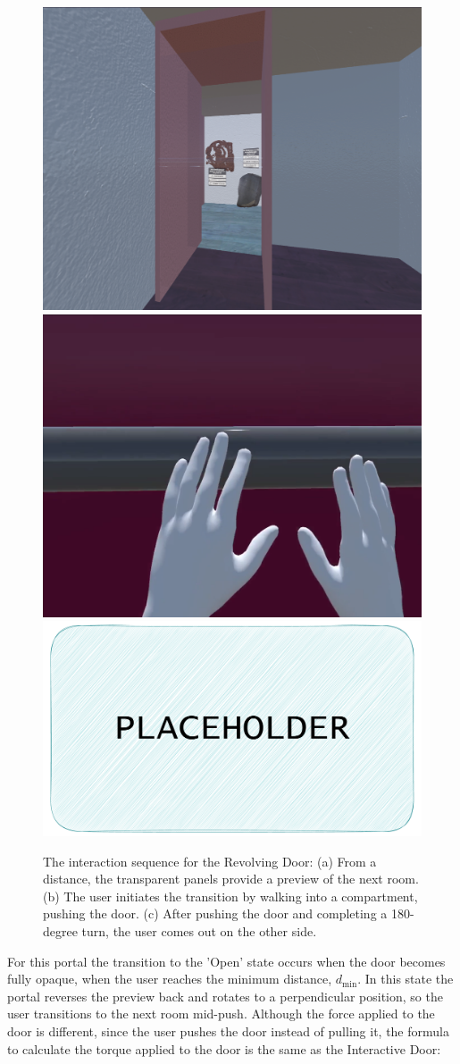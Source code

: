 \begin{figure}[t]
  \centering
  \includegraphics[width=.45\linewidth]{NOVAthesisFiles/Images/screenshots/Revolving Door Invisible.PNG}
  \hfill
  \includegraphics[width=.45\linewidth]{NOVAthesisFiles/Images/screenshots/Capture Revolving.PNG}
  \hfill
  \includegraphics[width=.45\linewidth]{NOVAthesisFiles/Images/placeholder.pdf}
  \caption{The interaction sequence for the Revolving Door: (a) From a distance, the transparent panels provide a preview of the next room. 
  (b) The user initiates the transition by walking into a compartment, pushing the door.
  (c) After pushing the door and completing a 180-degree turn, the user comes out on the other side. 
  }
  \label{fig:rv-door-sc}
\end{figure}

For this portal the transition to the 'Open' state occurs when the door becomes fully opaque, when the user reaches the minimum distance, $d_{\min}$.
In this state the portal reverses the preview back and rotates to a perpendicular position, so the user transitions to the next room mid-push.
Although the force applied to the door is different, since the user pushes the door instead of pulling it, the formula to calculate the 
torque applied to the door is the same as the Interactive Door:

